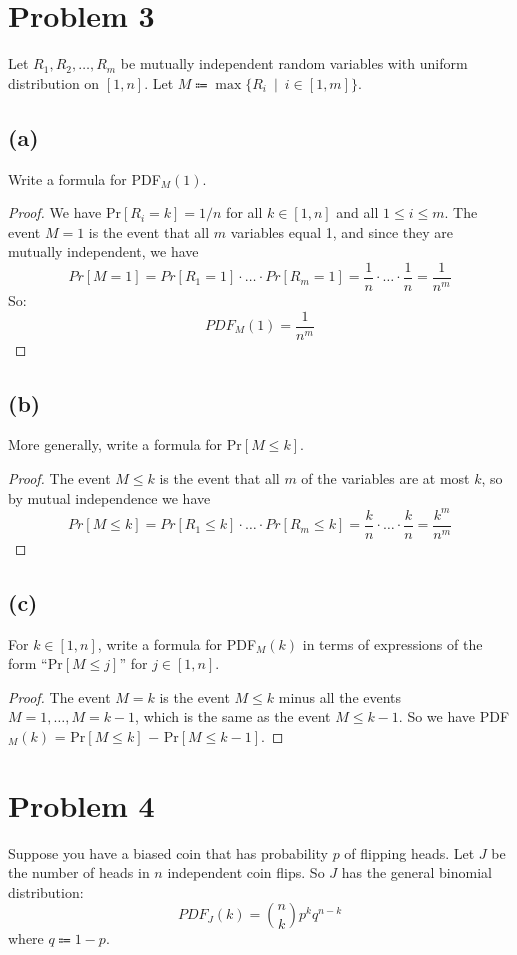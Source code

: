 \documentclass[14pt]{extarticle}
\begin{document}
\section{Problem 3}
Let $R_1, R_2, \ldots, R_m$ be mutually independent random variables with uniform distribution on $[1,n]$. Let $M \Coloneqq \max \{R_i \,\,\, | \,\,\, i \in [1, m]\}$.

\subsection{(a)}
Write a formula for PDF$_M(1)$.

\begin{proof}
We have Pr$[R_i = k] = 1/n$ for all $k \in [1,n]$ and all $1 \leq i \leq m$. The event $M = 1$ is the event that all $m$ variables equal 1, and since they are mutually independent, we have
$$
Pr[M = 1] = Pr[R_1 = 1] \cdot \ldots \cdot Pr[R_m = 1] = \frac{1}{n} \cdot \ldots \cdot \frac{1}{n} = \frac{1}{n^m}
$$
So:
$$
PDF_M(1) = \frac{1}{n^m}
$$
\end{proof}

\subsection{(b)}
More generally, write a formula for Pr$[M \leq k]$.

\begin{proof}
The event $M \leq k$ is the event that all $m$ of the variables are at most $k$, so by mutual independence we have
$$
Pr[M \leq k] = Pr[R_1 \leq k] \cdot \ldots \cdot Pr[R_m \leq k] = \frac{k}{n} \cdot \ldots \cdot \frac{k}{n} = \frac{k^m}{n^m}
$$
\end{proof}

\subsection{(c)}
For $k \in [1,n]$, write a formula for PDF$_M(k)$ in terms of expressions of the form ``Pr$[M \leq j]$'' for $j \in [1, n]$.

\begin{proof}
The event $M = k$ is the event $M \leq k$ minus all the events $M = 1, \ldots, M = k-1$, which is the same as the event $M \leq k-1$. So we have PDF$_M(k)$ = Pr$[M \leq k]$ $-$ Pr$[M \leq k-1]$.
\end{proof}

\section{Problem 4}
Suppose you have a biased coin that has probability $p$ of flipping heads. Let $J$ be the number of heads in $n$ independent coin flips. So $J$ has the general binomial distribution:
$$
PDF_J(k) = \binom{n}{k}p^kq^{n-k}
$$
where $q \Coloneqq 1-p$.
\end{document}
